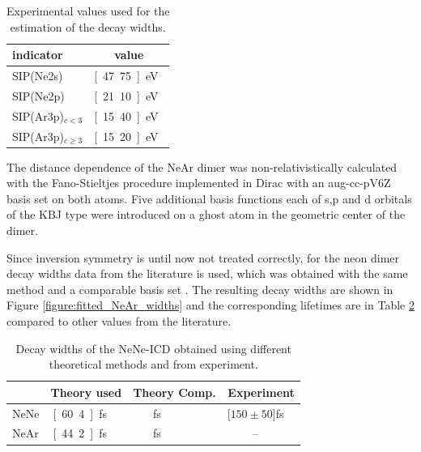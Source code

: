 \begin{table}[h]
 \caption{Experimental values used for the estimation of the decay widths.}
 \label{exp_input}
 \centering
 \begin{tabular}{lc}
  \toprule
  indicator            &  value \\
  \midrule
  SIP(Ne2s)            &  \unit[47.75]{eV} \footnotemark[1]\\
  SIP(Ne2p)            &  \unit[21.10]{eV} \footnotemark[1]\\
  SIP(Ar3p)$_{c<3}$    &  \unit[15.40]{eV} \footnotemark[1]\\
  SIP(Ar3p)$_{c\ge 3}$ &  \unit[15.20]{eV} \footnotemark[1]\\
  \bottomrule
 \end{tabular}
\end{table}

The distance dependence of the NeAr dimer was non-relativistically calculated with
the Fano-Stieltjes procedure implemented in Dirac \cite{DIRAC13,Fasshauer14_2}
with an aug-cc-pV6Z basis set on both atoms. Five additional basis functions each
of s,p and d orbitals of the
KBJ type \cite{Kaufmann89} were introduced on a ghost atom in the
geometric center of the dimer.

Since inversion symmetry is until now not treated correctly,
for the neon dimer decay widths data from the literature is used, which was
obtained with the same method and a comparable basis set \cite{Averbukh06_1}.
The resulting decay widths are shown in Figure \ref{figure:fitted_NeAr_widths}
and the corresponding lifetimes are in Table \ref{table:NeAr_gammas} compared
to other values from the literature.

\begin{table}[htb]
 \centering
 \caption{Decay widths of the NeNe-ICD obtained using different theoretical
          methods and from experiment.}
 \begin{tabular}{lcrcrcr}
  \toprule
        & \multicolumn{2}{c}{Theory used} & \multicolumn{2}{c}{Theory Comp.} & \multicolumn{2}{c}{Experiment} \\
  \midrule
   NeNe & \unit[60.4]{fs} & \cite{Averbukh06_1} & \unit[92]{fs} & \cite{Vaval07} & \unit[$150\pm 50$]{fs} & \cite{Schnorr13}\\
   NeAr & \unit[44.2]{fs} & & \unit[36]{fs} & \cite{Scheit06} &  --  &\\
  \bottomrule
 \end{tabular}
 \label{table:NeAr_gammas}
\end{table}

